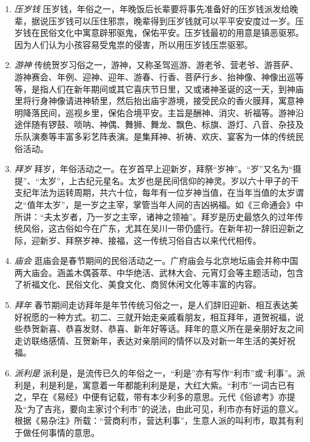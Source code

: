 \begin{enumerate}
\item \emph{压岁钱}
压岁钱，年俗之一，年晚饭后长辈要将事先准备好的压岁钱派发给晚辈，据说压岁钱可以压住邪祟，晚辈得到压岁钱就可以平平安安度过一岁。压岁钱在民俗文化中寓意辟邪驱鬼，保佑平安。压岁钱最初的用意是镇恶驱邪。因为人们认为小孩容易受鬼祟的侵害，所以用压岁钱压祟驱邪。

\item \emph{游神}
传统贺岁习俗之一，游神，又称圣驾巡游、游老爷、营老爷、游菩萨、游神赛会、年例、迎神、迎年、游春、行香、菩萨行乡、抬神像、神像出巡等等，是指人们在新年期间或其它喜庆节日里，又或诸神圣诞的这一天，到神庙里将行身神像请进神轿里，然后抬出庙宇游境，接受民众的香火膜拜，寓意神明降落民间，巡视乡里，保佑合境平安。主旨是酬神、消灾、祈福等。游神沿途伴随有锣鼓、唢呐、神偶、舞狮、舞龙、飘色、标旗、游灯、八音、杂技及乐队演奏等丰富多彩艺阵表演。是集拜神、祈祷、欢庆、宴客为一体的传统民俗活动。

\item \emph{拜岁}
拜岁，年俗活动之一。在岁首早上迎新岁，拜祭“岁神”。“岁”又名为“摄提”、“太岁”，上古纪元星名。太岁也是民间信仰的神灵。岁以六十甲子的干支纪年法为运转周期，共六十位，每年有一位岁神当值，在当年当值的太岁谓之“值年太岁”，是一岁之主宰，掌管当年人间的吉凶祸福。如《三命通会》中所讲：“夫太岁者，乃一岁之主宰，诸神之领袖”。拜岁是历史最悠久的过年传统风俗，这古俗如今在广东，尤其在吴川一带仍盛行。在新年初一辞旧迎新之际，迎新岁、拜祭岁神、接福，这一传统习俗自古以来代代相传。

\item \emph{庙会}
逛庙会是春节期间的民俗活动之一。广府庙会与北京地坛庙会并称中国两大庙会。涵盖木偶荟萃、中华绝活、武林大会、元宵灯会等主题活动，包含了祈福文化、民俗文化、美食文化、商贸休闲文化等丰富的内容。

\item \emph{拜年}
春节期间走访拜年是年节传统习俗之一，是人们辞旧迎新、相互表达美好祝愿的一种方式。初二、三就开始走亲戚看朋友，相互拜年，道贺祝福，说些恭贺新喜、恭喜发财、恭喜、新年好等话。拜年的意义所在是亲朋好友之间走访联络感情、互贺新年，表达对亲朋间的情怀以及对新一年生活的美好祝福。

\item \emph{派利是}
派利是，是流传已久的年俗之一，“利是”亦有写作“利市”或“利事”。派利是，利是利是，寓意着一年都能利利是是，大红大紫。“利市”一词古已有之，早在《易经》中便有记载，带有本少利多的意思。元代《俗谚考》亦提及“为了吉兆，要向主家讨个利市”的说法，由此可见，利市亦有好运的意义。 根据《易杂注》所载：“营商利市，营达利事”，生意人派的叫利市，取其有利于做任何事情的意思。


\end{enumerate}
